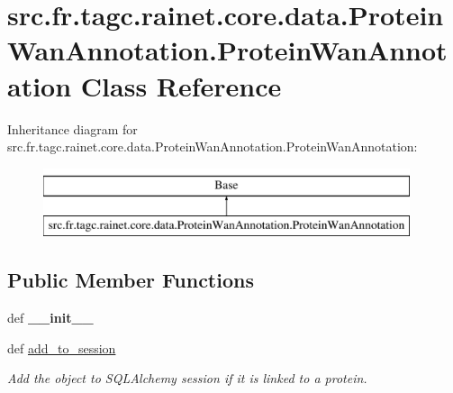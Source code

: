\hypertarget{classsrc_1_1fr_1_1tagc_1_1rainet_1_1core_1_1data_1_1ProteinWanAnnotation_1_1ProteinWanAnnotation}{\section{src.\-fr.\-tagc.\-rainet.\-core.\-data.\-Protein\-Wan\-Annotation.\-Protein\-Wan\-Annotation Class Reference}
\label{classsrc_1_1fr_1_1tagc_1_1rainet_1_1core_1_1data_1_1ProteinWanAnnotation_1_1ProteinWanAnnotation}
}
Inheritance diagram for src.\-fr.\-tagc.\-rainet.\-core.\-data.\-Protein\-Wan\-Annotation.\-Protein\-Wan\-Annotation\-:\begin{figure}[H]
\begin{center}
\leavevmode
\includegraphics[height=2.000000cm]{classsrc_1_1fr_1_1tagc_1_1rainet_1_1core_1_1data_1_1ProteinWanAnnotation_1_1ProteinWanAnnotation}
\end{center}
\end{figure}
\subsection*{Public Member Functions}
\begin{DoxyCompactItemize}
\item 
\hypertarget{classsrc_1_1fr_1_1tagc_1_1rainet_1_1core_1_1data_1_1ProteinWanAnnotation_1_1ProteinWanAnnotation_a455af53258c76d7e88b862ac5253c5c5}{def {\bfseries \-\_\-\-\_\-init\-\_\-\-\_\-}}\label{classsrc_1_1fr_1_1tagc_1_1rainet_1_1core_1_1data_1_1ProteinWanAnnotation_1_1ProteinWanAnnotation_a455af53258c76d7e88b862ac5253c5c5}

\item 
\hypertarget{classsrc_1_1fr_1_1tagc_1_1rainet_1_1core_1_1data_1_1ProteinWanAnnotation_1_1ProteinWanAnnotation_a149ed14ede4cffce7969e64bea9ab632}{def \hyperlink{classsrc_1_1fr_1_1tagc_1_1rainet_1_1core_1_1data_1_1ProteinWanAnnotation_1_1ProteinWanAnnotation_a149ed14ede4cffce7969e64bea9ab632}{add\-\_\-to\-\_\-session}}\label{classsrc_1_1fr_1_1tagc_1_1rainet_1_1core_1_1data_1_1ProteinWanAnnotation_1_1ProteinWanAnnotation_a149ed14ede4cffce7969e64bea9ab632}

\begin{DoxyCompactList}\small\item\em Add the object to S\-Q\-L\-Alchemy session if it is linked to a protein. \end{DoxyCompactList}\end{DoxyCompactItemize}
